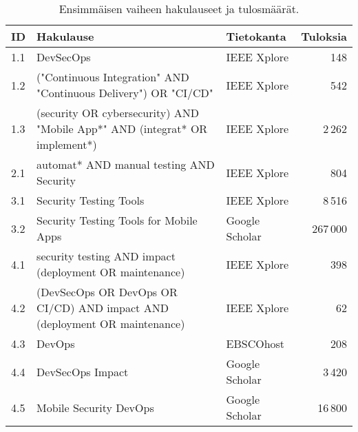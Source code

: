 \documentclass[bscthesis,finnish,oneside,biblatex]{uefcsthesis}
\begin{document}
\begin{table}[htbp]
  \centering
  \footnotesize  %
  \caption{Ensimmäisen vaiheen hakulauseet ja tulosmäärät.}
  \label{tab:first-phase}
  \begin{tabularx}{\textwidth}{l>{\ttfamily\small\raggedright\arraybackslash}X l r}
    \toprule
    \textbf{ID} &
    \textbf{Hakulause} &
    \textbf{Tietokanta} &
    \textbf{Tuloksia} \\
    \midrule
    1.1 & DevSecOps                                                                                                & IEEE Xplore     & 148     \\
    1.2 & ("Continuous Integration" AND "Continuous Delivery") OR "CI/CD"                                          & IEEE Xplore     & 542     \\
    1.3 & (security OR cybersecurity) AND "Mobile App*" AND (integrat* OR implement*)                              & IEEE Xplore     & 2\,262  \\
    2.1 & automat* AND manual testing AND Security                                                                  & IEEE Xplore     & 804     \\
    3.1 & Security Testing Tools                                                                                   & IEEE Xplore     & 8\,516  \\
    3.2 & Security Testing Tools for Mobile Apps                                                                   & Google Scholar  & 267\,000 \\
    4.1 & security testing AND impact (deployment OR maintenance)                                                  & IEEE Xplore     & 398     \\
    4.2 & (DevSecOps OR DevOps OR CI/CD) AND impact AND (deployment OR maintenance)                                & IEEE Xplore     & 62      \\
    4.3 & DevOps                                                                                                   & EBSCOhost       & 208     \\
    4.4 & DevSecOps Impact                                                                                         & Google Scholar  & 3\,420  \\
    4.5 & Mobile Security DevOps                                                                                   & Google Scholar  & 16\,800 \\
    \bottomrule
  \end{tabularx}
\end{table}
\end{document}
